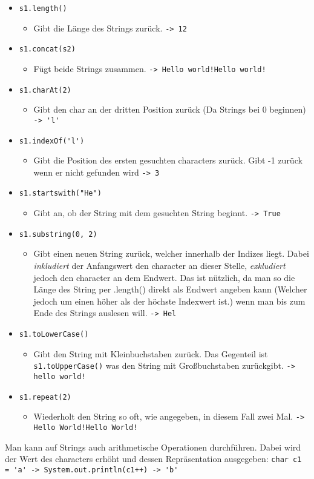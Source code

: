 \documentclass{article}
\begin{document}
	\begin{itemize}
		\item{\verb|s1.length()|}
		\begin{itemize}
			\item{Gibt die Länge des Strings zurück. \verb|-> 12|}
		\end{itemize}
		\item{\verb|s1.concat(s2)|}
		\begin{itemize}
			\item{Fügt beide Strings zusammen. \verb|-> Hello world!Hello world!|}
		\end{itemize}
		\item{\verb|s1.charAt(2)|}
		\begin{itemize}
			\item{Gibt den char an der dritten Position zurück (Da Strings bei 0 beginnen) \verb|-> 'l'|}
		\end{itemize}
		\item{\verb|s1.indexOf('l')|}
		\begin{itemize}
			\item{Gibt die Position des ersten gesuchten characters zurück. Gibt -1 zurück wenn er nicht gefunden wird \verb|-> 3|}
		\end{itemize}
		\item{\verb|s1.startswith("He")|}
		\begin{itemize}
			\item{Gibt an, ob der String mit dem gesuchten String beginnt. \verb|-> True|}
		\end{itemize}
		\item{\verb|s1.substring(0, 2)|}
		\begin{itemize}
			\item{Gibt einen neuen String zurück, welcher innerhalb der Indizes liegt. Dabei \textit{inkludiert} der Anfangswert den character an dieser Stelle, \textit{exkludiert} jedoch den character an dem Endwert. Das ist nützlich, da man so die Länge des String per .length() direkt als Endwert angeben kann (Welcher jedoch um einen höher als der höchste Indexwert ist.) wenn man bis zum Ende des Strings auslesen will. \verb|-> Hel|}
		\end{itemize}
		\item{\verb|s1.toLowerCase()|}
		\begin{itemize}
			\item{Gibt den String mit Kleinbuchstaben zurück. Das Gegenteil ist \verb|s1.toUpperCase()|  was den String mit Großbuchstaben zurückgibt. \verb|-> hello world!|}
		\end{itemize}
		\item{\verb|s1.repeat(2)|}
		\begin{itemize}
			\item{Wiederholt den String so oft, wie angegeben, in diesem Fall zwei Mal. \verb|-> Hello World!Hello World!|}
		\end{itemize}
	\end{itemize}
	Man kann auf Strings auch arithmetische Operationen durchführen. Dabei wird der Wert des characters erhöht und dessen Repräsentation ausgegeben: \verb|char c1 = 'a' -> System.out.println(c1++) -> 'b'|
\end{document}
